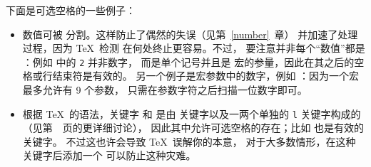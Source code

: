 \documentclass{book}
\begin{document}
下面是可选空格的一些例子：

\begin{itemize}
\item 数值可被  分割。这样防止了偶然的失误（见第~\ref{number}~章）%
并加速了处理过程，因为 \TeX\ 检测  在何处终止更容易。不过，
要注意并非每个“数值”都是 ：例如  中的 {\tt 2} 并非数字，
而是单个记号并且是  宏的参量，因此在其之后的空格或行结束符是有效的。
另一个例子是宏参数中的数字，例如 ：因为一个宏最多允许有 9 个参数，
只需在参数字符之后扫描一位数字即可。

\item 根据 \TeX\ 的语法，关键字  和 
是由  关键字以及一两个单独的 {\tt l} 关键字构成的%
（见第~\pageref{keywords}~页的更详细讨论），
因此其中允许可选空格的存在；比如  也是有效的关键字。
不过这也许会导致 \TeX\ 误解你的本意，
对于大多数情形，在这种关键字后添加一个  可以防止这种灾难。


\end{itemize}
\end{document}
